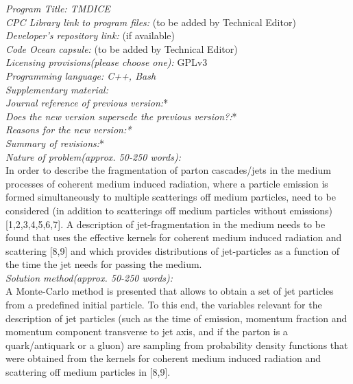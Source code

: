 \documentclass[preprint,12pt]{elsarticle}
\newcommand{\tmdice}{{\sf TMDICE}}
\begin{document}
\begin{small}
\noindent
{\em Program Title: \tmdice}                                          \\
{\em CPC Library link to program files:} (to be added by Technical Editor) \\
{\em Developer's repository link:} (if available) \\
{\em Code Ocean capsule:} (to be added by Technical Editor)\\
{\em Licensing provisions(please choose one):} GPLv3  \\
{\em Programming language: C++, Bash}                                   \\
{\em Supplementary material:}                                 \\
{\em Journal reference of previous version:}*                  \\
{\em Does the new version supersede the previous version?:}*   \\
{\em Reasons for the new version:*}\\
{\em Summary of revisions:}*\\
{\em Nature of problem(approx. 50-250 words):}\\
In order to describe the fragmentation of parton cascades/jets in the medium processes of coherent medium induced radiation, where a particle emission is formed simultaneously to multiple scatterings off medium particles, need to be considered (in addition to scatterings off medium particles without emissions)[1,2,3,4,5,6,7].
A description of jet-fragmentation in the medium needs to be found that uses the effective kernels for coherent medium induced radiation and scattering [8,9] and which provides distributions of jet-particles  as a function of the time the jet needs for passing the medium.\\
{\em Solution method(approx. 50-250 words):}\\
A Monte-Carlo method is presented that allows to obtain a set of jet particles from a predefined initial particle.
To this end, the variables relevant for the description of jet particles (such as the time of emission, momentum fraction and momentum component transverse to jet axis, and if the parton is a quark/antiquark or a gluon) are sampling from probability density functions that were obtained from the kernels for coherent medium induced radiation and scattering off medium particles in [8,9]. 

\end{small}
\end{document}
